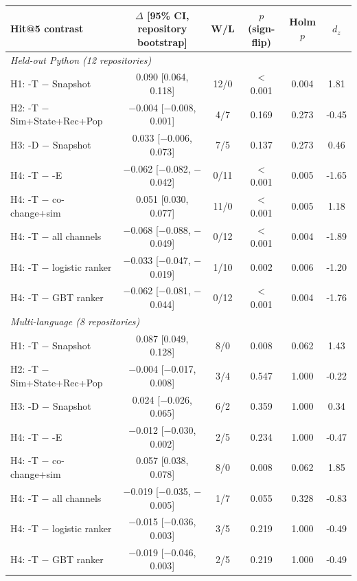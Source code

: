 \begin{tabular}{lccccc}
\toprule
Hit@5 contrast & $\Delta$ [95\% CI, repository bootstrap] & W/L & $p$ (sign-flip) & Holm $p$ & $d_z$ \\
\midrule
\multicolumn{6}{l}{\emph{Held-out Python (12 repositories)}} \\
H1: \sys{}-T $-$ Snapshot & 0.090 [0.064, 0.118] & 12/0 & $<$0.001 & 0.004 & 1.81 \\
H2: \sys{}-T $-$ Sim+State+Rec+Pop & $-$0.004 [$-$0.008, 0.001] & 4/7 & 0.169 & 0.273 & -0.45 \\
H3: \sys{}-D $-$ Snapshot & 0.033 [$-$0.006, 0.073] & 7/5 & 0.137 & 0.273 & 0.46 \\
H4: \sys{}-T $-$ \sys{}-E & $-$0.062 [$-$0.082, $-$0.042] & 0/11 & $<$0.001 & 0.005 & -1.65 \\
H4: \sys{}-T $-$ co-change+sim & 0.051 [0.030, 0.077] & 11/0 & $<$0.001 & 0.005 & 1.18 \\
H4: \sys{}-T $-$ all channels & $-$0.068 [$-$0.088, $-$0.049] & 0/12 & $<$0.001 & 0.004 & -1.89 \\
H4: \sys{}-T $-$ logistic ranker & $-$0.033 [$-$0.047, $-$0.019] & 1/10 & 0.002 & 0.006 & -1.20 \\
H4: \sys{}-T $-$ GBT ranker & $-$0.062 [$-$0.081, $-$0.044] & 0/12 & $<$0.001 & 0.004 & -1.76 \\
\midrule
\multicolumn{6}{l}{\emph{Multi-language (8 repositories)}} \\
H1: \sys{}-T $-$ Snapshot & 0.087 [0.049, 0.128] & 8/0 & 0.008 & 0.062 & 1.43 \\
H2: \sys{}-T $-$ Sim+State+Rec+Pop & $-$0.004 [$-$0.017, 0.008] & 3/4 & 0.547 & 1.000 & -0.22 \\
H3: \sys{}-D $-$ Snapshot & 0.024 [$-$0.026, 0.065] & 6/2 & 0.359 & 1.000 & 0.34 \\
H4: \sys{}-T $-$ \sys{}-E & $-$0.012 [$-$0.030, 0.002] & 2/5 & 0.234 & 1.000 & -0.47 \\
H4: \sys{}-T $-$ co-change+sim & 0.057 [0.038, 0.078] & 8/0 & 0.008 & 0.062 & 1.85 \\
H4: \sys{}-T $-$ all channels & $-$0.019 [$-$0.035, $-$0.005] & 1/7 & 0.055 & 0.328 & -0.83 \\
H4: \sys{}-T $-$ logistic ranker & $-$0.015 [$-$0.036, 0.003] & 3/5 & 0.219 & 1.000 & -0.49 \\
H4: \sys{}-T $-$ GBT ranker & $-$0.019 [$-$0.046, 0.003] & 2/5 & 0.219 & 1.000 & -0.49 \\
\bottomrule
\end{tabular}